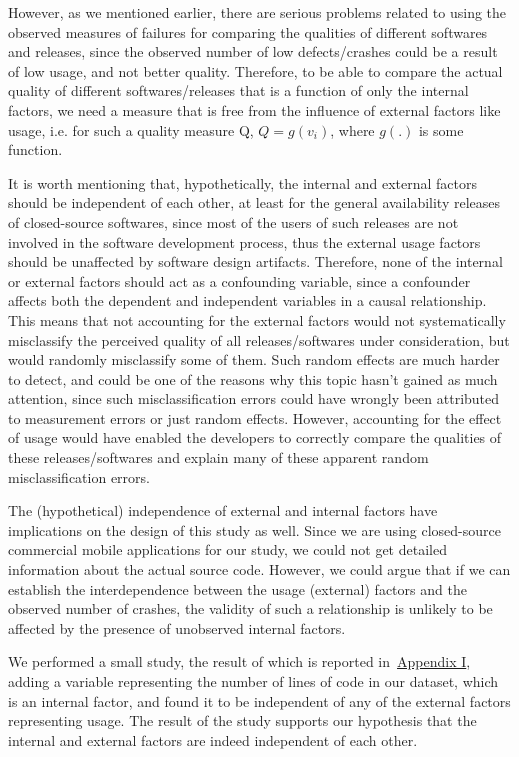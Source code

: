 \documentclass[smallcondensed]{svjour3}     %
\begin{document}
However, as we mentioned earlier, there are serious problems related to using the observed measures of failures for comparing the qualities of different softwares and releases, since the observed number of low defects/crashes could be a result of low usage, and not better quality. Therefore, to be able to compare the actual quality of different softwares/releases that is a function of only the internal factors, we need a measure that is free from the influence of external factors like usage, i.e. for such a quality measure Q, $Q = g(v_i)$, where $g(.)$ is some function.

It is worth mentioning that, hypothetically, the internal and external factors should be independent of each other, at least for the general availability releases of closed-source softwares, since most of the users of such releases are not involved in the software development process, thus the external usage factors should be unaffected by software design artifacts. Therefore, none of the internal or external factors should act as a confounding variable, since a confounder affects both the dependent and independent variables in a causal relationship. This means that not accounting for the external factors would not systematically misclassify the perceived quality of all releases/softwares under consideration, but would randomly misclassify some of them. Such random effects are much harder to detect, and could be one of the reasons why this topic hasn't gained as much attention, since such misclassification errors could have wrongly been attributed to measurement errors or just random effects. However, accounting for the effect of usage would have enabled the developers to correctly compare the qualities of these releases/softwares and explain many of these apparent random misclassification errors.

The (hypothetical) independence of external and internal factors have implications on the design of this study as well. Since we are using closed-source commercial mobile applications for our study, we could not get detailed information about the actual source code. However, we could argue that if we can establish the interdependence between the usage (external) factors and the observed number of crashes, the validity of such a relationship is unlikely to be affected by the presence of unobserved internal factors.

We performed a small study, the result of which is reported in~\hyperref[app1]{Appendix I},  adding a variable representing the number of lines of code in our dataset, which is an internal factor, and found it to be independent of any of the external factors representing usage. The result of the study supports our hypothesis that the internal and external factors are indeed independent of each other. 
\end{document}
